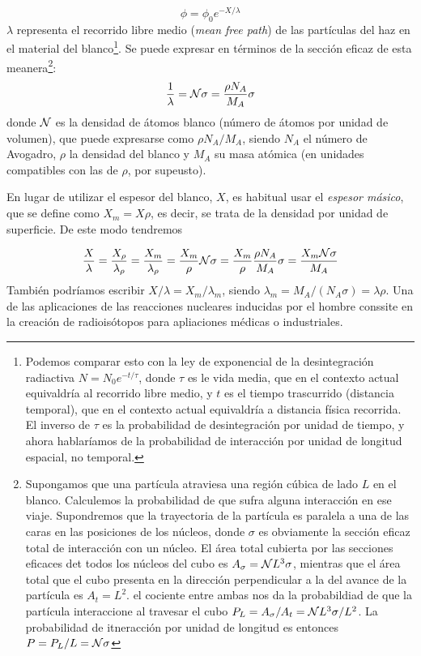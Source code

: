 \begin{equation}
    \phi = \phi_0 e^{-X/\lambda}
\end{equation}
$\lambda$ representa el recorrido libre medio (\textit{mean free path}) de las partículas del haz en el material del blanco\footnote{Podemos comparar esto con la ley de exponencial de la desintegración radiactiva $N=N_0 e^{-t/\tau}$, donde $\tau$ es le vida media, que en el contexto actual equivaldría al recorrido libre medio, y $t$ es el tiempo trascurrido (distancia temporal), que en el contexto actual equivaldría a distancia física recorrida. El inverso de $\tau$ es la probabilidad de desintegración por unidad de tiempo, y ahora hablaríamos de la probabilidad de interacción por unidad de longitud espacial, no temporal.}. Se puede expresar en términos de la sección eficaz de esta meanera\footnote{Supongamos que una partícula atraviesa una región cúbica de lado $L$ en el blanco. Calculemos la probabilidad de que sufra alguna interacción en ese viaje. Supondremos que la trayectoria de la partícula es paralela a una de las caras en las posiciones de los núcleos, donde $\sigma$ es obviamente la sección eficaz total de interacción con un núcleo. El área total cubierta por las secciones eficaces det todos los núcleos del cubo es $A_\sigma = \mathcal{N} L^3 \sigma$, mientras que el área total que el cubo presenta en la dirección perpendicular a la del avance de la partícula es $A_t=L^2$. el cociente entre ambas nos da la probabildiad de que la partícula interaccione al travesar el cubo $P_L  = A_\sigma / A_t = \mathcal{N} L^3 \sigma / L^2$. La probabilidad de itneracción por unidad de longitud es entonces $P=P_L/L=\mathcal{N} \sigma$}: \\

\begin{equation}
    \frac{1}{\lambda} = \mathcal{N} \sigma = \frac{\rho N_A }{M_A} \sigma 
\end{equation}
donde $\mathcal{N}$ es la densidad de átomos blanco (número de átomos por unidad de volumen), que puede expresarse como $\rho N_A /M_A$, siendo $N_A$ el número de Avogadro, $\rho$ la densidad del blanco y $M_A$ su masa atómica (en unidades compatibles con las de $\rho$, por supeusto). 

En lugar de utilizar el espesor del blanco, $X$, es habitual usar el \textit{espesor másico}, que se define como $X_m=X\rho$, es decir, se trata de la densidad por unidad de superficie. De este modo tendremos 

\begin{equation}
    \frac{X}{\lambda} = \frac{X_\rho}{\lambda_\rho} = \frac{X_m}{\lambda_\rho} = \frac{X_m}{\rho} \mathcal{N} \sigma = \frac{X_m}{\rho} \frac{\rho N_A}{M_A} \sigma = \frac{X_m \mathcal{N} \sigma}{M_A}
\end{equation}
También podríamos escribir $X/\lambda=X_m/\lambda_m$, siendo $\lambda_m = M_A /(N_A\sigma)=\lambda \rho$. Una de las aplicaciones de las reacciones nucleares inducidas por el hombre conssite en la creación de radioisótopos para apliaciones médicas o industriales.


